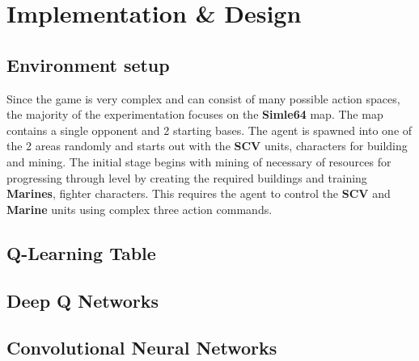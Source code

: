 \chapter{Implementation \& Design}
\label{implem}
\section{Environment setup}
Since the game is very complex and can consist of many possible action spaces, the majority of the experimentation focuses on the \textbf{Simle64} map. The map contains a single opponent and 2 starting bases. The agent is spawned into one of the 2 areas randomly and starts out with the \textbf{SCV} units, characters for building and mining. The initial stage begins with mining of necessary of resources for progressing through level by creating the required buildings and training \textbf{Marines}, fighter characters. This requires the agent to control the \textbf{SCV} and \textbf{Marine} units using complex three action commands.

\section{Q-Learning Table}


\section{Deep Q Networks}


\section{Convolutional Neural Networks}